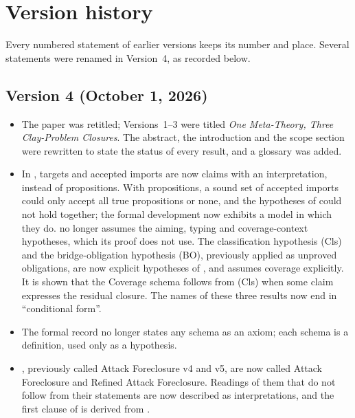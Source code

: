 \section{Version history}\label{app:version-history}
\begingroup\small
Every numbered statement of earlier versions keeps its number and
place.  Several statements were renamed in Version~4, as recorded
below.

\subsection*{Version 4 (October 1, 2026)}
\begin{itemize}
    \item The paper was retitled; Versions~1--3 were titled \emph{One
    Meta-Theory, Three Clay-Problem Closures}.  The abstract, the
    introduction and the scope section were rewritten to state the
    status of every result, and a glossary was added.
  \item In , targets and accepted imports are now
    claims with an interpretation, instead of propositions.  With
    propositions, a sound set of accepted imports could only accept all
    true propositions or none, and the hypotheses of
     could not hold together; the formal
    development now exhibits a model in which they do.
     no longer assumes the aiming, typing
    and coverage-context hypotheses, which its proof does not use.  The
    classification hypothesis (Cls) and the bridge-obligation hypothesis
    (BO), previously applied as unproved obligations, are now explicit
    hypotheses of ,
        and  assumes coverage explicitly.
    It is shown that the Coverage schema follows from (Cls) when some
    claim expresses the residual closure.  The names of these three
    results now end in ``conditional form''.
  \item The formal record no longer states any schema as an axiom; each
    schema is a definition, used only as a hypothesis.
  \item {},
    previously called Attack Foreclosure v4 and v5, are now called
    Attack Foreclosure and Refined Attack Foreclosure.  Readings of them
    that do not follow from their statements are now described as
    interpretations, and the first clause of
     is derived from
    .

\end{itemize}
